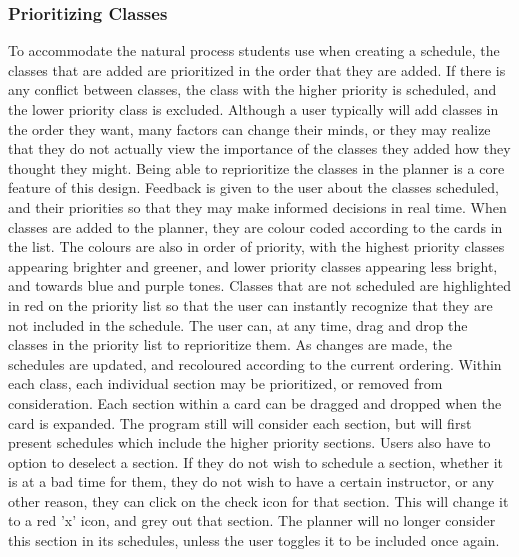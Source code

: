 \documentclass{article}
\begin{document}
\subsubsection{Prioritizing Classes}
To accommodate the natural process students use when creating a schedule, the classes that are added are prioritized in the order that they are added. If there is any conflict between classes, the class with the higher priority is scheduled, and the lower priority class is excluded. Although a user typically will add classes in the order they want, many factors can change their minds, or they may realize that they do not actually view the importance of the classes they added how they thought they might. Being able to reprioritize the classes in the planner is a core feature of this design.
\newline
\newline
Feedback is given to the user about the classes scheduled, and their priorities so that they may make informed decisions in real time. When classes are added to the planner, they are colour coded according to the cards in the list. The colours are also in order of priority, with the highest priority classes appearing brighter and greener, and lower priority classes appearing less bright, and towards blue and purple tones. Classes that are not scheduled are highlighted in red on the priority list so that the user can instantly recognize that they are not included in the schedule. The user can, at any time, drag and drop the classes in the priority list to reprioritize them. As changes are made, the schedules are updated, and recoloured according to the current ordering.
\newline
\newline
Within each class, each individual section may be prioritized, or removed from consideration. Each section within a card can be dragged and dropped when the card is expanded. The program still will consider each section, but will first present schedules which include the higher priority sections. Users also have to option to deselect a section. If they do not wish to schedule a section, whether it is at a bad time for them, they do not wish to have a certain instructor, or any other reason, they can click on the check icon for that section. This will change it to a red 'x' icon, and grey out that section. The planner will no longer consider this section in its schedules, unless the user toggles it to be included once again.
\end{document}
